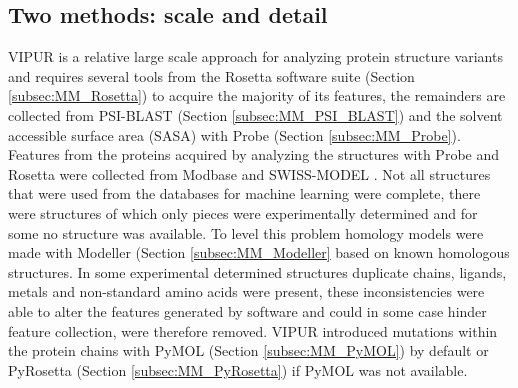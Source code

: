 
\subsection{Two methods: scale and detail}
VIPUR is a relative large scale approach for analyzing protein structure variants and requires several tools from the Rosetta software suite (Section \ref{subsec:MM_Rosetta}) to acquire the majority of its features, the remainders are collected from PSI-BLAST (Section \ref{subsec:MM_PSI_BLAST}) and the solvent accessible surface area (SASA) with Probe (Section \ref{subsec:MM_Probe}). Features from the proteins acquired by analyzing the structures with Probe and Rosetta were collected from Modbase \cite{} and
SWISS-MODEL \cite{}.
Not all structures that were used from the databases for machine learning were complete, there were structures of which only pieces were experimentally determined and for some no structure was available. To level this problem homology models were made with Modeller (Section \ref{subsec:MM_Modeller} based on known homologous structures. In some experimental determined structures duplicate chains, ligands, metals and non-standard amino acids were present, these inconsistencies were able to alter the features generated by software and could in some case hinder feature collection, were therefore removed. VIPUR introduced mutations within the protein chains with PyMOL (Section \ref{subsec:MM_PyMOL}) by default or PyRosetta (Section \ref{subsec:MM_PyRosetta}) if PyMOL was not available.

